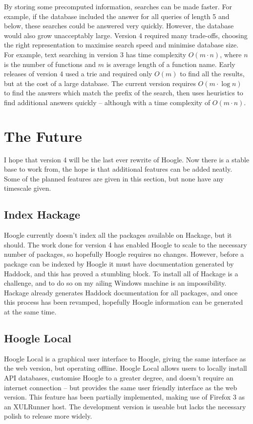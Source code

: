 \documentclass{tmr}
\begin{document}
By storing some precomputed information, searches can be made faster. For example, if the database included the answer for all queries of length 5 and below, these searches could be answered very quickly. However, the database would also grow unacceptably large. Version 4 required many trade-offs, choosing the right representation to maximise search speed and minimise database size. For example, text searching in version 3 has time complexity $O(m \cdot n)$, where $n$ is the number of functions and $m$ is average length of a function name. Early releases of version 4 used a trie and required only $O(m)$ to find all the results, but at the cost of a large database. The current version requires $O(m \cdot \log n)$ to find the answers which match the prefix of the search, then uses heuristics to find additional answers quickly -- although with a time complexity of $O(m \cdot n)$.


\section{The Future}

I hope that version 4 will be the last ever rewrite of Hoogle. Now there is a stable base to work from, the hope is that additional features can be added neatly. Some of the planned features are given in this section, but none have any timescale given.

\subsection{Index Hackage}

Hoogle currently doesn't index all the packages available on Hackage, but it should. The work done for version 4 has enabled Hoogle to scale to the necessary number of packages, so hopefully Hoogle requires no changes. However, before a package can be indexed by Hoogle it must have documentation generated by Haddock, and this has proved a stumbling block. To install all of Hackage is a challenge, and to do so on my ailing Windows machine is an impossibility. Hackage already generates Haddock documentation for all packages, and once this process has been revamped, hopefully Hoogle information can be generated at the same time.

\subsection{Hoogle Local}

Hoogle Local is a graphical user interface to Hoogle, giving the same interface as the web version, but operating offline. Hoogle Local allows users to locally install API databases, customise Hoogle to a greater degree, and doesn't require an internet connection -- but provides the same user friendly interface as the web version. This feature has been partially implemented, making use of Firefox 3 as an XULRunner host. The development version is useable but lacks the necessary polish to release more widely.
\end{document}
